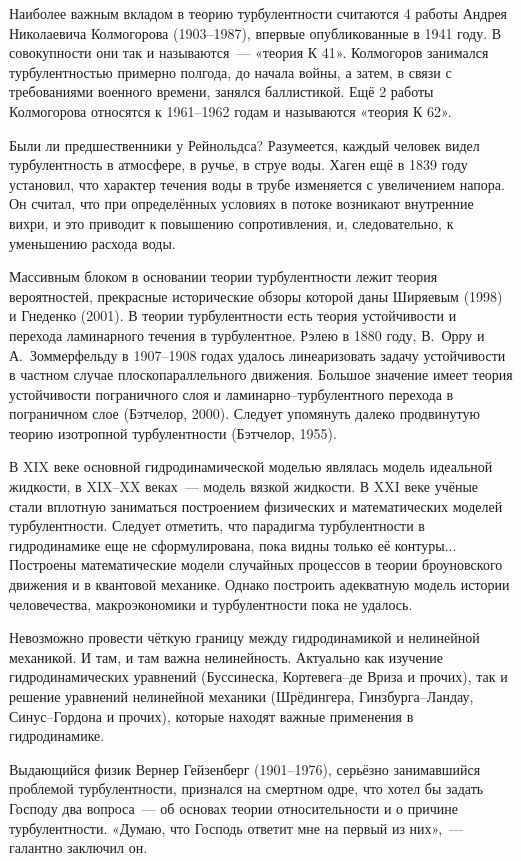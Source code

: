 Наиболее важным вкладом в теорию турбулентности считаются 4 работы Андрея Николаевича Колмогорова 
(1903--1987), впервые опубликованные в 1941 году. В совокупности они так и называются~--- «теория К 41». 
Колмогоров занимался турбулентностью примерно полгода, до начала войны, а затем, в связи с требованиями 
военного времени, занялся баллистикой. Ещё 2 работы Колмогорова относятся к 1961--1962 годам и называются «теория К 62».

Были ли предшественники у Рейнольдса? Разумеется, каждый человек видел турбулентность в атмосфере, 
в ручье, в струе воды. Хаген ещё в 1839 году установил, что характер течения воды в трубе изменяется 
с увеличением напора. Он считал, что при определённых условиях в потоке возникают внутренние вихри, 
и это приводит к повышению сопротивления, и, следовательно, к уменьшению расхода воды.

Массивным блоком в основании теории турбулентности лежит теория вероятностей, прекрасные исторические 
обзоры которой даны Ширяевым (1998) и Гнеденко (2001). В теории турбулентности есть теория устойчивости 
и перехода ламинарного течения в турбулентное. Рэлею в 1880 году, В.~Орру и А.~Зоммерфельду в 1907--1908 
годах удалось линеаризовать задачу устойчивости в частном случае плоскопараллельного движения. Большое 
значение имеет теория устойчивости пограничного слоя и ламинарно--турбулентного перехода в пограничном слое 
(Бэтчелор, 2000). Следует упомянуть далеко продвинутую теорию изотропной турбулентности (Бэтчелор, 1955).

В XIX веке основной гидродинамической моделью являлась модель идеальной жидкости, в XIX--XX веках~--- 
модель вязкой жидкости. В XXI веке учёные стали вплотную заниматься построением физических и математических
 моделей турбулентности. Следует отметить, что парадигма турбулентности в гидродинамике еще не сформулирована,
  пока видны только её контуры... Построены математические модели случайных процессов в теории броуновского 
  движения и в квантовой механике. Однако построить адекватную модель истории человечества, макроэкономики 
  и турбулентности пока не удалось.

Невозможно провести чёткую границу между гидродинамикой и нелинейной механикой. И там, и там важна нелинейность. 
Актуально как изучение гидродинамических уравнений (Буссинеска, Кортевега--де Вриза и прочих), так и решение 
уравнений нелинейной механики (Шрёдингера, Гинзбурга--Ландау, Синус--Гордона и прочих), которые находят важные 
применения в гидродинамике.

Выдающийся физик Вернер Гейзенберг (1901--1976), серьёзно занимавшийся проблемой турбулентности, признался на 
смертном одре, что хотел бы задать Господу два вопроса~--- об основах теории относительности и о причине 
турбулентности. «Думаю, что Господь ответит мне на первый из них»,~--- галантно заключил он.

